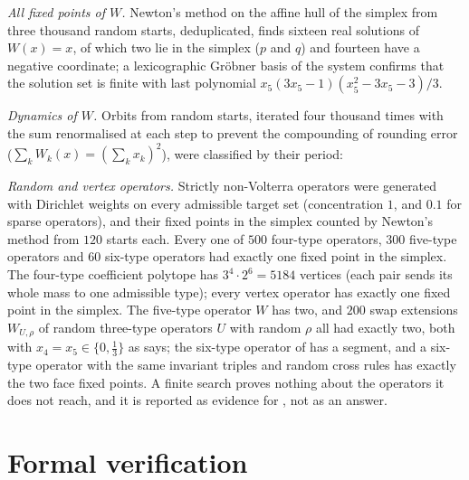 \documentclass[11pt]{amsart}
\theoremstyle{definition}
\begin{document}
\emph{All fixed points of $W$.} Newton's method on the affine hull of the simplex from three thousand random starts, deduplicated, finds sixteen real solutions of $W(x)=x$, of which two lie in the simplex ($p$ and $q$) and fourteen have a negative coordinate; a lexicographic Gr\"obner basis of the system confirms that the solution set is finite with last polynomial $x_5(3x_5-1)(x_5^2-3x_5-3)/3$.

\emph{Dynamics of $W$.} Orbits from random starts, iterated four thousand times with the sum renormalised at each step to prevent the compounding of rounding error ($\sum_kW_k(x)=(\sum_kx_k)^2$), were classified by their period: 

\emph{Random and vertex operators.} Strictly non-Volterra operators were generated with Dirichlet weights on every admissible target set (concentration $1$, and $0.1$ for sparse operators), and their fixed points in the simplex counted by Newton's method from $120$ starts each. Every one of $500$ four-type operators, $300$ five-type operators and $60$ six-type operators had exactly one fixed point in the simplex. The four-type coefficient polytope has $3^4\cdot2^6=5184$ vertices (each pair sends its whole mass to one admissible type); every vertex operator has exactly one fixed point in the simplex. The five-type operator $W$ has two, and $200$ swap extensions $W_{U,\rho}$ of random three-type operators $U$ with random $\rho$ all had exactly two, both with $x_4=x_5\in\{0,\frac13\}$ as  says; the six-type operator of  has a segment, and a six-type operator with the same invariant triples and random cross rules has exactly the two face fixed points. A finite search proves nothing about the operators it does not reach, and it is reported as evidence for , not as an answer.

\section{Formal verification}\label{sec:lean}
\end{document}
